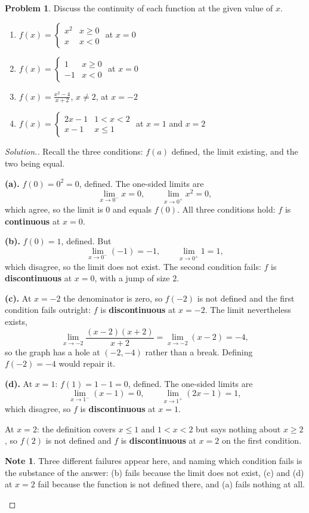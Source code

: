 \documentclass[11pt,a4paper]{article}
\theoremstyle{definition}
\newtheorem{note}[thm]{Note}
\newtheorem{problemx}{Problem}[section]
\newenvironment{problem}{\begin{problemx}}{\end{problemx}}
\newenvironment{solution}
  {\renewcommand{\qedsymbol}{}\begin{proof}[\textit{Solution}.]}
  {\end{proof}}
\begin{document}
\begin{problem}
Discuss the continuity of each function at the given value of $x$.
\begin{enumerate}
\item[(a).] $f(x)=\begin{cases}x^2 & x\geq 0\\ x & x<0\end{cases}$ at $x=0$
\item[(b).] $f(x)=\begin{cases}1 & x\geq 0\\ -1 & x<0\end{cases}$ at $x=0$
\item[(c).] $f(x)=\frac{x^2-4}{x+2}$, $x\neq 2$, at $x=-2$
\item[(d).] $f(x)=\begin{cases}2x-1 & 1<x<2\\ x-1 & x\leq 1\end{cases}$ at $x=1$ and
$x=2$
\end{enumerate}
\end{problem}

\begin{solution}
Recall the three conditions: $f(a)$ defined, the limit existing, and the two being
equal.

\textbf{(a).} $f(0)=0^2=0$, defined. The one-sided limits are
$$\lim_{x\to 0^-}x=0,\qquad \lim_{x\to 0^+}x^2=0,$$
which agree, so the limit is $0$ and equals $f(0)$. All three conditions hold:
$f$ is \textbf{continuous} at $x=0$.

\textbf{(b).} $f(0)=1$, defined. But
$$\lim_{x\to 0^-}(-1)=-1,\qquad \lim_{x\to 0^+}1=1,$$
which disagree, so the limit does not exist. The second condition fails: $f$ is
\textbf{discontinuous} at $x=0$, with a jump of size $2$.

\textbf{(c).} At $x=-2$ the denominator is zero, so $f(-2)$ is not defined and the
first condition fails outright: $f$ is \textbf{discontinuous} at $x=-2$. The limit
nevertheless exists,
$$\lim_{x\to -2}\frac{(x-2)(x+2)}{x+2}=\lim_{x\to -2}(x-2)=-4,$$
so the graph has a hole at $(-2,-4)$ rather than a break. Defining $f(-2)=-4$ would
repair it.

\textbf{(d).} At $x=1$: $f(1)=1-1=0$, defined. The one-sided limits are
$$\lim_{x\to 1^-}(x-1)=0,\qquad \lim_{x\to 1^+}(2x-1)=1,$$
which disagree, so $f$ is \textbf{discontinuous} at $x=1$.

At $x=2$: the definition covers $x\leq 1$ and $1<x<2$ but says nothing about $x\geq 2$,
so $f(2)$ is not defined and $f$ is \textbf{discontinuous} at $x=2$ on the first
condition.

\begin{note}
Three different failures appear here, and naming which condition fails is the substance
of the answer: (b) fails because the limit does not exist, (c) and (d) at $x=2$ fail
because the function is not defined there, and (a) fails nothing at all.
\end{note}
\end{solution}
\end{document}
